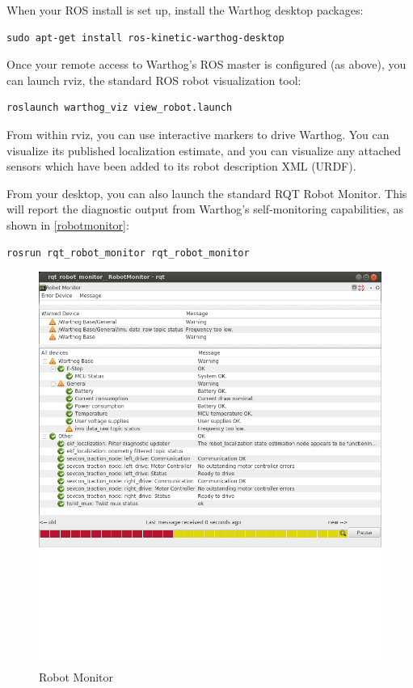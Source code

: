 \documentclass[]{clearpath-latex/clearpath-manual}
\begin{document}
When your ROS install is set up, install the Warthog desktop packages:

\begin{lstlisting}
sudo apt-get install ros-kinetic-warthog-desktop
\end{lstlisting}

Once your remote access to Warthog's ROS master is configured (as above), you can launch rviz, the standard ROS robot visualization tool:

\begin{lstlisting}
roslaunch warthog_viz view_robot.launch
\end{lstlisting}

From within rviz, you can use interactive markers to drive Warthog. You can visualize its published localization estimate, and you can visualize any attached sensors which have been added to its robot description XML (URDF).

\pagebreak[4]

From your desktop, you can also launch the standard RQT Robot Monitor. This will report the diagnostic output from Warthog's self-monitoring capabilities, as shown in \autoref{robotmonitor}:

\begin{lstlisting}
rosrun rqt_robot_monitor rqt_robot_monitor
\end{lstlisting}

\begin{figure}[!htb]
  \centering
  \includegraphics[width=0.70\linewidth]{graphics/rqt_robot_monitor.png}
  \caption{Robot Monitor}
  \label{robotmonitor}
\end{figure}
\end{document}
